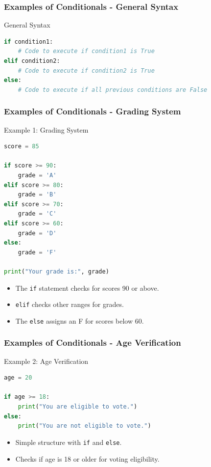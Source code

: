 \documentclass{beamer}
\begin{document}
\begin{frame}[fragile]
    \frametitle{Examples of Conditionals - General Syntax}
    \begin{block}{General Syntax}
        \begin{lstlisting}[language=Python]
if condition1:
    # Code to execute if condition1 is True
elif condition2:
    # Code to execute if condition2 is True
else:
    # Code to execute if all previous conditions are False
        \end{lstlisting}
    \end{block}
\end{frame}

\begin{frame}[fragile]
    \frametitle{Examples of Conditionals - Grading System}
    \begin{block}{Example 1: Grading System}
        \begin{lstlisting}[language=Python]
score = 85

if score >= 90:
    grade = 'A'
elif score >= 80:
    grade = 'B'
elif score >= 70:
    grade = 'C'
elif score >= 60:
    grade = 'D'
else:
    grade = 'F'

print("Your grade is:", grade)
        \end{lstlisting}
    \end{block}
    \begin{itemize}
        \item The \texttt{if} statement checks for scores 90 or above.
        \item \texttt{elif} checks other ranges for grades.
        \item The \texttt{else} assigns an F for scores below 60.
    \end{itemize}
\end{frame}

\begin{frame}[fragile]
    \frametitle{Examples of Conditionals - Age Verification}
    \begin{block}{Example 2: Age Verification}
        \begin{lstlisting}[language=Python]
age = 20

if age >= 18:
    print("You are eligible to vote.")
else:
    print("You are not eligible to vote.")
        \end{lstlisting}
    \end{block}
    \begin{itemize}
        \item Simple structure with \texttt{if} and \texttt{else}.
        \item Checks if age is 18 or older for voting eligibility.
    \end{itemize}
\end{frame}
\end{document}
